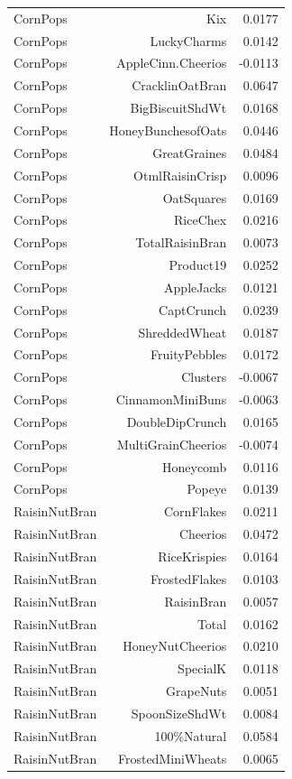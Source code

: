 \begin{longtable}{@{}lrr@{}}
CornPops & Kix & 0.0177 \\
CornPops & LuckyCharms & 0.0142 \\
CornPops & AppleCinn.Cheerios & -0.0113 \\
CornPops & CracklinOatBran & 0.0647 \\
CornPops & BigBiscuitShdWt & 0.0168 \\
CornPops & HoneyBunchesofOats & 0.0446 \\
CornPops & GreatGraines & 0.0484 \\
CornPops & OtmlRaisinCrisp & 0.0096 \\
CornPops & OatSquares & 0.0169 \\
CornPops & RiceChex & 0.0216 \\
CornPops & TotalRaisinBran & 0.0073 \\
CornPops & Product19 & 0.0252 \\
CornPops & AppleJacks & 0.0121 \\
CornPops & CaptCrunch & 0.0239 \\
CornPops & ShreddedWheat & 0.0187 \\
CornPops & FruityPebbles & 0.0172 \\
CornPops & Clusters & -0.0067 \\
CornPops & CinnamonMiniBuns & -0.0063 \\
CornPops & DoubleDipCrunch & 0.0165 \\
CornPops & MultiGrainCheerios & -0.0074 \\
CornPops & Honeycomb & 0.0116 \\
CornPops & Popeye & 0.0139 \\
RaisinNutBran & CornFlakes & 0.0211 \\
RaisinNutBran & Cheerios & 0.0472 \\
RaisinNutBran & RiceKrispies & 0.0164 \\
RaisinNutBran & FrostedFlakes & 0.0103 \\
RaisinNutBran & RaisinBran & 0.0057 \\
RaisinNutBran & Total & 0.0162 \\
RaisinNutBran & HoneyNutCheerios & 0.0210 \\
RaisinNutBran & SpecialK & 0.0118 \\
RaisinNutBran & GrapeNuts & 0.0051 \\
RaisinNutBran & SpoonSizeShdWt & 0.0084 \\
RaisinNutBran & 100\%Natural & 0.0584 \\
RaisinNutBran & FrostedMiniWheats & 0.0065 \\

\end{longtable}
